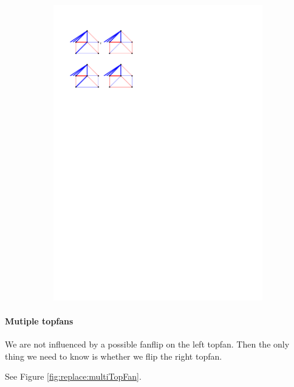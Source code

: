 \begin{figure}
\begin{subfigure}[b]{0.45 \textwidth}
        \includegraphics[width =\textwidth]{chordReplace/img/stopSingleTopFan}
        \caption{}
        \label{fig:replace:stopSingleTopFan}
    \end{subfigure}
    	\caption{}

\end{figure}

\paragraph{Mutiple topfans}
We are not influenced by a possible fanflip on the left topfan. Then the only thing we need to know is whether we flip the right topfan.

See Figure \ref{fig:replace:multiTopFan}.

